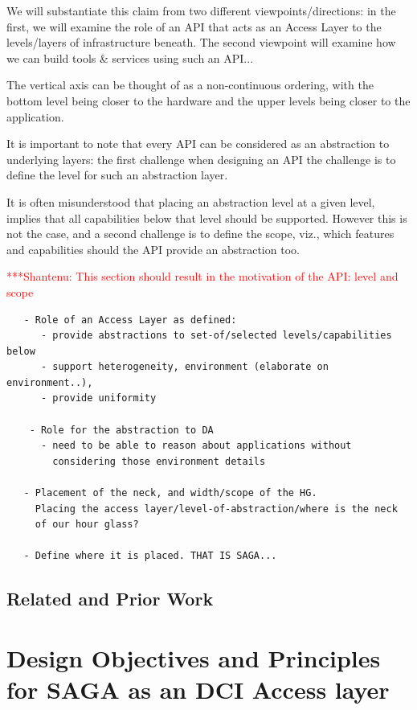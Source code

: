 \documentclass[a4paper,12pt]{article}
\newcommand{\jhanote}[1]{  {\textcolor{red}  { ***Shantenu: #1 }}}
\newcommand{\jhanote}[1]{}
\begin{document}
We will substantiate this claim from two different
viewpoints/directions: in the first, we will examine the role of an
API that acts as an Access Layer to the levels/layers of
infrastructure beneath. The second viewpoint will examine how we can
build tools \& services using such an API...

The vertical axis can be thought of as a non-continuous ordering, with
the bottom level being closer to the hardware and the upper levels
being closer to the application.

It is important to note that every API can be considered as an
abstraction to underlying layers: the first challenge when designing
an API the challenge is to define the level for such an abstraction
layer.  

It is often misunderstood that placing an abstraction level at a given
level, implies that all capabilities below that level should be
supported. However this is not the case, and a second challenge is to
define the scope, viz., which features and capabilities should the API
provide an abstraction too.

\jhanote{This section should result in the motivation of the API:
  level and scope}


\begin{verbatim}
   - Role of an Access Layer as defined:
      - provide abstractions to set-of/selected levels/capabilities below
      - support heterogeneity, environment (elaborate on environment..), 
      - provide uniformity

    - Role for the abstraction to DA 
      - need to be able to reason about applications without 
        considering those environment details

   - Placement of the neck, and width/scope of the HG.
     Placing the access layer/level-of-abstraction/where is the neck
     of our hour glass?

   - Define where it is placed. THAT IS SAGA...
\end{verbatim}

\subsection{Related and Prior Work}
% 
\section{Design Objectives and Principles for SAGA as an DCI Access layer}
\label{sec.obj}
\end{document}
